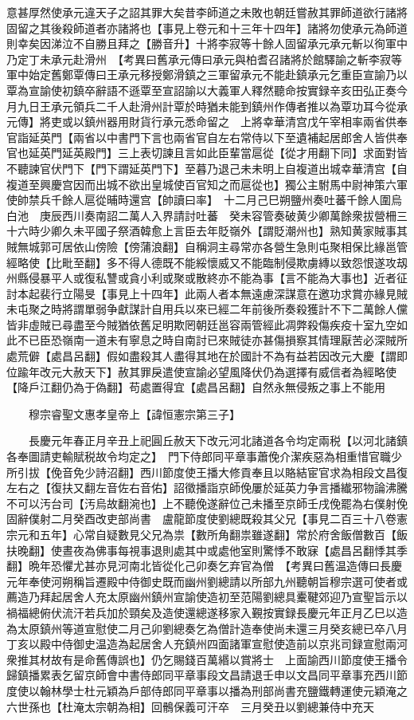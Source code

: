 意甚厚然使承元違天子之詔其罪大矣昔李師道之未敗也朝廷嘗赦其罪師道欲行諸將固留之其後殺師道者亦諸將也【事見上卷元和十三年十四年】諸將勿使承元為師道則幸矣因涕泣不自勝且拜之【勝音升】十將李寂等十餘人固留承元承元斬以徇軍中乃定丁未承元赴滑州　【考異曰舊承元傳曰承元與柏耆召諸將於館驛諭之斬李寂等軍中始定舊鄭覃傳曰王承元移授鄭滑鎮之三軍留承元不能赴鎮承元乞重臣宣諭乃以覃為宣諭使初鎮卒辭語不遜覃至宣詔諭以大義軍人釋然聽命按實録辛亥田弘正奏今月九日王承元領兵二千人赴滑州計覃於時猶未能到鎮州作傳者推以為覃功耳今從承元傳】將吏或以鎮州器用財貨行承元悉命留之　上將幸華清宫戊午宰相率兩省供奉官詣延英門【兩省以中書門下言也兩省官自左右常侍以下至遺補起居郎舍人皆供奉官也延英門延英殿門】三上表切諫且言如此臣輩當扈從【從才用翻下同】求面對皆不聽諫官伏門下【門下謂延英門下】至暮乃退己未未明上自複道出城幸華清宫【自複道至興慶宫因而出城不欲出皇城使百官知之而扈從也】獨公主駙馬中尉神策六軍使帥禁兵千餘人扈從晡時還宫【帥讀曰率】　十二月己巳朔鹽州奏吐蕃千餘人圍烏白池　庚辰西川奏南詔二萬人入界請討吐蕃　癸未容管奏破黄少卿萬餘衆拔營柵三十六時少卿久未平國子祭酒韓愈上言臣去年貶嶺外【謂貶潮州也】熟知黄家賊事其賊無城郭可居依山傍險【傍蒲浪翻】自稱洞主尋常亦各營生急則屯聚相保比緣邕管經略使【比毗至翻】多不得人德既不能綏懷威又不能臨制侵欺虜縳以致怨恨遂攻刼州縣侵暴平人或復私讐或貪小利或聚或散終亦不能為事【言不能為大事也】近者征討本起裴行立陽旻【事見上十四年】此兩人者本無遠慮深謀意在邀功求賞亦緣見賊未屯聚之時將謂單弱争獻謀計自用兵以來已經二年前後所奏殺獲計不下二萬餘人儻皆非虛賊已尋盡至今賊猶依舊足明欺罔朝廷邕容兩管經此凋弊殺傷疾疫十室九空如此不已臣恐嶺南一道未有寧息之時自南討已來賊徒亦甚傷損察其情理厭苦必深賊所處荒僻【處昌呂翻】假如盡殺其人盡得其地在於國計不為有益若因改元大慶【謂即位踰年改元大赦天下】赦其罪戾遣使宣諭必望風降伏仍為選擇有威信者為經略使【降戶江翻仍為于偽翻】苟處置得宜【處昌呂翻】自然永無侵叛之事上不能用

　　穆宗睿聖文惠孝皇帝上【諱恒憲宗第三子】

　　長慶元年春正月辛丑上祀圓丘赦天下改元河北諸道各令均定兩税【以河北諸鎮各奉圖請吏輸賦税故令均定之】　門下侍郎同平章事蕭俛介潔疾惡為相重惜官職少所引拔【俛音免少詩沼翻】西川節度使王播大修貢奉且以賂結宦官求為相段文昌復左右之【復扶又翻左音佐右音佑】詔徵播詣京師俛屢於延英力争言播纎邪物論沸騰不可以汚台司【汚烏故翻涴也】上不聽俛遂辭位己未播至京師壬戌俛罷為右僕射俛固辭僕射二月癸酉改吏部尚書　盧龍節度使劉總既殺其父兄【事見二百三十八卷憲宗元和五年】心常自疑數見父兄為祟【數所角翻祟雖遂翻】常於府舍飯僧數百【飯扶晚翻】使晝夜為佛事每視事退則處其中或處他室則驚悸不敢寐【處昌呂翻悸其季翻】晩年恐懼尤甚亦見河南北皆從化己卯奏乞弃官為僧　【考異曰舊温造傳曰長慶元年奉使河朔稱旨遷殿中侍御史既而幽州劉總請以所部九州聽朝旨穆宗選可使者或薦造乃拜起居舍人充太原幽州鎮州宣諭使造初至范陽劉總具櫜鞬郊迎乃宣聖旨示以禍福總俯伏流汗若兵加於頸矣及造使還總遂移家入覲按實録長慶元年正月乙巳以造為太原鎮州等道宣慰使二月己卯劉總奏乞為僧計造奉使尚未還三月癸亥總已卒八月丁亥以殿中侍御史温造為起居舍人充鎮州四面諸軍宣慰使造前以京兆司録宣慰兩河衆推其材故有是命舊傳誤也】仍乞賜錢百萬緡以賞將士　上面諭西川節度使王播令歸鎮播累表乞留京師會中書侍郎同平章事段文昌請退壬申以文昌同平章事充西川節度使以翰林學士杜元穎為戶部侍郎同平章事以播為刑部尚書充鹽鐵轉運使元穎淹之六世孫也【杜淹太宗朝為相】回鶻保義可汗卒　三月癸丑以劉總兼侍中充天

